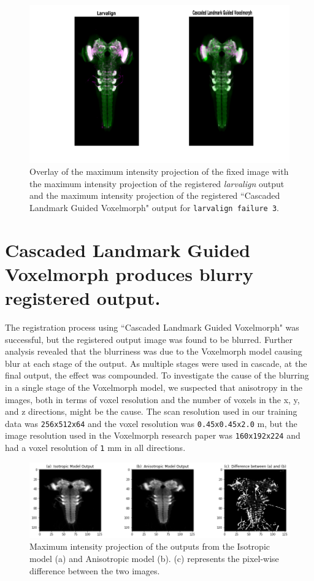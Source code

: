 \documentclass{book}
\begin{document}
	\begin{figure}[h!]
		\centering
		\includegraphics[width=0.9\columnwidth]{resources/chapter7/LRE_Visual/failure3.pdf}
		\caption{Overlay of the maximum intensity projection of the fixed image with the maximum intensity projection of the registered \textit{larvalign} output and the maximum intensity projection of the registered ``Cascaded Landmark Guided Voxelmorph" output for \texttt{larvalign failure 3}.}
		\label{fig:larvalign failure 3}
	\end{figure}
	
	\section{Cascaded Landmark Guided Voxelmorph produces blurry registered output.}
	The registration process using ``Cascaded Landmark Guided Voxelmorph" was successful, but the registered output image was found to be blurred. Further analysis revealed that the blurriness was due to the Voxelmorph model causing blur at each stage of the output. As multiple stages were used in cascade, at the final output, the effect was compounded. To investigate the cause of the blurring in a single stage of the Voxelmorph model, we suspected that anisotropy in the images, both in terms of voxel resolution and the number of voxels in the x, y, and z directions, might be the cause. The scan resolution used in our training data was \texttt{256x512x64} and the voxel resolution was \texttt{0.45x0.45x2.0} \textmu m, but the image resolution used in the Voxelmorph research paper was \texttt{160x192x224} and had a voxel resolution of \texttt{1} mm in all directions.
	
	\begin{figure}[H]
		\centering
		\includegraphics[width=0.7\columnwidth]{resources/discussion/anisotropic_effect/Result_1.png}
		\caption{Maximum intensity projection of the outputs from the Isotropic model (a) and Anisotropic model (b). (c) represents the pixel-wise difference between the two images.}
		\label{fig:anisotropisum_result1}
	\end{figure}
\end{document}
